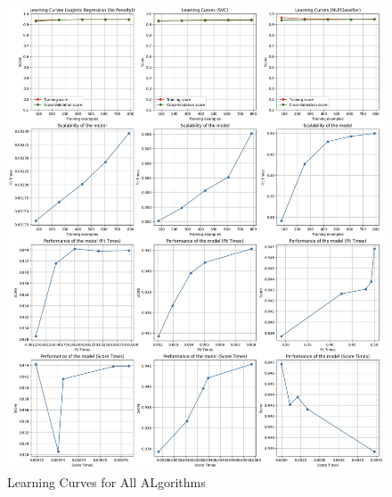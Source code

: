 \documentclass[conference]{IEEEtran}
\begin{document}
\begin{table}[htbp]
\centering
{}
\caption{Results of all algorithms after the Tuning Hyper-Parameter}
\label{tab:logistic-reg-params}
\end{table}

\begin{figure}[H]
    \centering
    \includegraphics[width=1\linewidth]{images/learningCurvesAll.png}
    \caption{Learning Curves for All ALgorithms}
    \label{fig:NN-Confusion-AllFeatures}
\end{figure}
\end{document}

